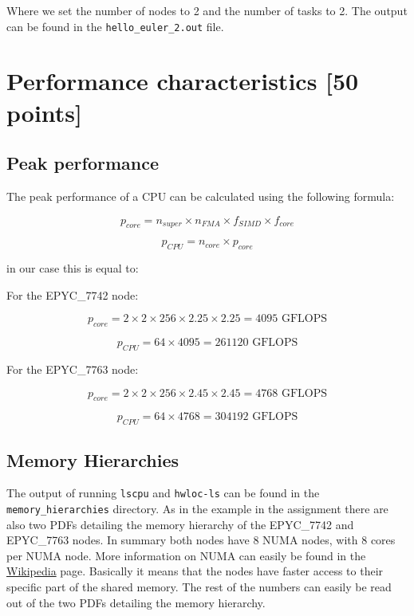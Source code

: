 \documentclass[unicode,11pt,a4paper,oneside,numbers=endperiod,openany]{scrartcl}
\begin{document}
Where we set the number of nodes to 2 and the number of tasks to 2. The output can be found in the \texttt{hello\_euler\_2.out} file.

\section{Performance characteristics [50 points]}

\subsection{Peak performance}

The peak performance of a CPU can be calculated using the following formula:

\begin{equation}
    p_{core} = n_{super} \times n_{FMA} \times f_{SIMD} \times f_{core}
\end{equation}

\begin{equation}
    p_{CPU} = n_{core} \times p_{core}
\end{equation}

in our case this is equal to:

For the EPYC\_7742 node:

\begin{equation}
    p_{core} = 2 \times 2 \times 256 \times 2.25 \times 2.25 = 4095 \text{ GFLOPS}
\end{equation}

\begin{equation}
    p_{CPU} = 64 \times 4095 = 261120 \text{ GFLOPS}
\end{equation}

For the EPYC\_7763 node:

\begin{equation}
    p_{core} = 2 \times 2 \times 256 \times 2.45 \times 2.45 = 4768 \text{ GFLOPS}
\end{equation}

\begin{equation}
    p_{CPU} = 64 \times 4768 = 304192 \text{ GFLOPS}
\end{equation}

\subsection{Memory Hierarchies}

The output of running \texttt{lscpu} and \texttt{hwloc-ls} can be found in the \texttt{memory\_hierarchies} directory. As in the example in the assignment there are also two PDFs detailing the memory hierarchy of the EPYC\_7742 and EPYC\_7763 nodes. In summary both nodes have 8 NUMA nodes, with 8 cores per NUMA node. More information on NUMA can easily be found in the \href{https://en.wikipedia.org/wiki/Non-uniform_memory_access}{Wikipedia} page. Basically it means that the nodes have faster access to their specific part of the shared memory. The rest of the numbers can easily be read out of the two PDFs detailing the memory hierarchy.
\end{document}
